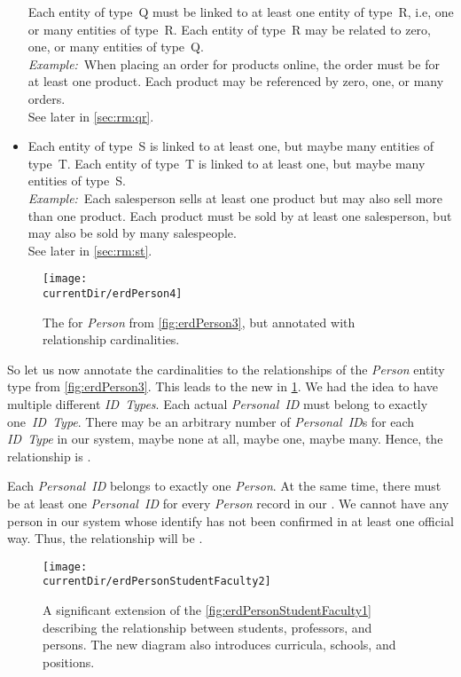 \begin{itemize}
Each entity of type~Q must be linked to at least one entity of type~R, i.e, one or many entities of type~R.
Each entity of type~R may be related to zero, one, or many entities of type~Q.~\cite{BS2023G:CFNIERD}\\%
\emph{Example:}~When placing an order for products online, the order must be for at least one product.
Each product may be referenced by zero, one, or many orders.~\cite{BS2023G:CFNIERD}\\%
See later in \cref{sec:rm:qr}.%
%
\item {}
Each entity of type~S is linked to at least one, but maybe many entities of type~T.
Each entity of type~T is linked to at least one, but maybe many entities of type~S.~\cite{T2025CDBMS:ERM}\\%
\emph{Example:}~Each salesperson sells at least one product but may also sell more than one product.
Each product must be sold by at least one salesperson, but may also be sold by many salespeople.~\cite{T2025CDBMS:ERM}\\%
See later in \cref{sec:rm:st}.%
%
\end{itemize}%
%
\FloatBarrier%
%
\begin{figure}%
\centering%
\texttt{[image: \\currentDir/erdPerson4]}%
\caption{The  for \emph{Person} from \cref{fig:erdPerson3}, but annotated with relationship cardinalities.}%
\label{fig:erdPerson4}%
\end{figure}%

So let us now annotate the cardinalities to the relationships of the \emph{Person} entity type from \cref{fig:erdPerson3}.
This leads to the new  in \cref{fig:erdPerson4}.
We had the idea to have multiple different \emph{ID~Types}.
Each actual \emph{Personal~ID} must belong to exactly one~\emph{ID~Type}.
There may be an arbitrary number of \emph{Personal~ID}s for each \emph{ID~Type} in our system, maybe none at all, maybe one, maybe many.
Hence, the relationship is .

Each \emph{Personal~ID} belongs to exactly one \emph{Person}.
At the same time, there must be at least one \emph{Personal~ID} for every \emph{Person} record in our \db.
We cannot have any person in our system whose identify has not been confirmed in at least one official way.
Thus, the relationship will be .

\begin{figure}%
\centering%
\texttt{[image: \\currentDir/erdPersonStudentFaculty2]}%
\caption{A significant extension of the \cref{fig:erdPersonStudentFaculty1}  describing the relationship between students, professors, and persons. %
The new diagram also introduces curricula, schools, and positions.}%
\label{fig:erdPersonStudentFaculty2}%
\end{figure}%

